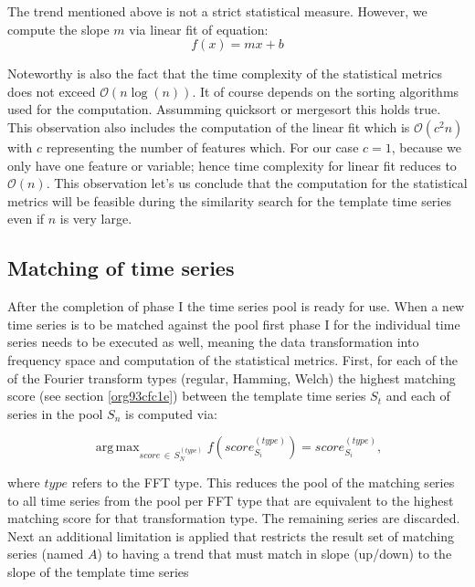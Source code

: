 \documentclass[phd,black, hidelinks]{PrincetonThesis}
\DeclareMathOperator*{\argmax}{arg\,max}
\begin{document}
The trend mentioned above is not a strict statistical measure. However, we compute the slope \(m\) via linear fit of equation:
\begin{equation}
f(x) = m x + b
\end{equation}


Noteworthy is also the fact that the time complexity of the statistical metrics does not exceed \(\mathcal{O}(n \log(n))\). It of course depends on the sorting algorithms used for the computation. Assumming quicksort or mergesort this holds true. This observation also includes the computation of the linear fit which is \(\mathcal{O}(c^2 n)\) with \(c\) representing the number of features which. For our case \(c=1\), because we only have one feature or variable; hence time complexity for linear fit reduces to \(\mathcal{O}(n)\). This observation let's us conclude that the computation for the statistical metrics will be feasible during the similarity search for the template time series even if \(n\) is very large.
\subsection{Matching of time series}
\label{sec:orge7b944b}
\label{orgc5ae61a}
After the completion of phase I the time series pool is ready for use. When a new time series is to be matched against the pool first phase I for the individual time series needs to be executed as well, meaning the data transformation into frequency space and computation of the statistical metrics. First, for each of the of the Fourier transform types (regular, Hamming, Welch) the highest matching score (see section \ref{org93cfc1e}) between the template time series \(S_t\) and each of series in the pool \(S_n\) is computed via:

\begin{equation}
\argmax_{score\, \in \, S_{N}^{(type)}} f(score_{S_i}^{(type)}) = score_{S_i}^{(type)},
\end{equation}

where \(type\) refers to the FFT type. This reduces the pool of the matching series to all time series from the pool per FFT type that are equivalent to the highest matching score for that transformation type. The remaining series are discarded. Next an additional limitation is applied that restricts the result set of matching series (named \(A\)) to having a trend that must match in slope (up/down) to the slope of the template time series
\end{document}
